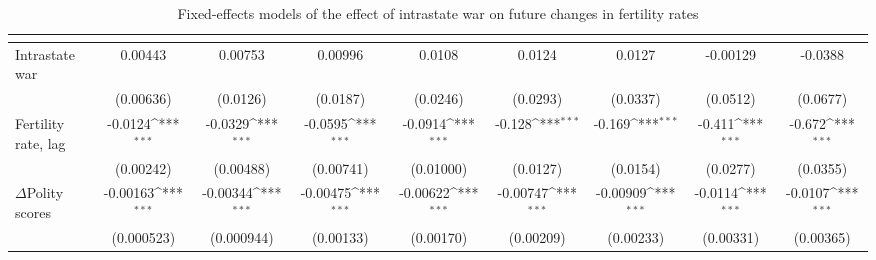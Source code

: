 \begin{table}[htbp]\centering
\def\sym#1{\ifmmode^{#1}\else\(^{#1}\)\fi}
\caption{Fixed-effects models of the effect of intrastate war on future changes in fertility rates \label{intrawarfertility}}
\begin{tabular}{l*{8}{c}}
\hline\hline
                    &&&&&&&&\\
\hline
Intrastate war      &     0.00443         &     0.00753         &     0.00996         &      0.0108         &      0.0124         &      0.0127         &    -0.00129         &     -0.0388         \\
                    &   (0.00636)         &    (0.0126)         &    (0.0187)         &    (0.0246)         &    (0.0293)         &    (0.0337)         &    (0.0512)         &    (0.0677)         \\
[1em]
Fertility rate, lag        &     -0.0124\sym{***}&     -0.0329\sym{***}&     -0.0595\sym{***}&     -0.0914\sym{***}&      -0.128\sym{***}&      -0.169\sym{***}&      -0.411\sym{***}&      -0.672\sym{***}\\
                    &   (0.00242)         &   (0.00488)         &   (0.00741)         &   (0.01000)         &    (0.0127)         &    (0.0154)         &    (0.0277)         &    (0.0355)         \\
[1em]
$\Delta$Polity scores           &    -0.00163\sym{***}&    -0.00344\sym{***}&    -0.00475\sym{***}&    -0.00622\sym{***}&    -0.00747\sym{***}&    -0.00909\sym{***}&     -0.0114\sym{***}&     -0.0107\sym{***}\\
                    &  (0.000523)         &  (0.000944)         &   (0.00133)         &   (0.00170)         &   (0.00209)         &   (0.00233)         &   (0.00331)         &   (0.00365)         \\

\end{tabular}
\end{table}
